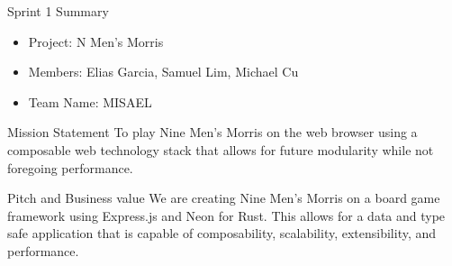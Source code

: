 \documentclass[presentation]{beamer}
\date{\today}
\title{}
\begin{document}
\begin{frame}[label={sec:orge6b5e10}]{Sprint 1 Summary}
\begin{itemize}
\item Project: N Men's Morris
\item Members: Elias Garcia, Samuel Lim, Michael Cu
\item Team Name: MISAEL
\end{itemize}
\begin{block}{Mission Statement}
To play Nine Men’s Morris on the web browser using a composable web technology
stack that allows for future modularity while not foregoing performance.
\end{block}

\begin{block}{Pitch and Business value}
We are creating Nine Men’s Morris on a board game framework using Express.js and Neon for
Rust. This allows for a data and type safe application that is capable of composability,
scalability, extensibility, and performance.
\end{block}
\end{frame}
\end{document}
